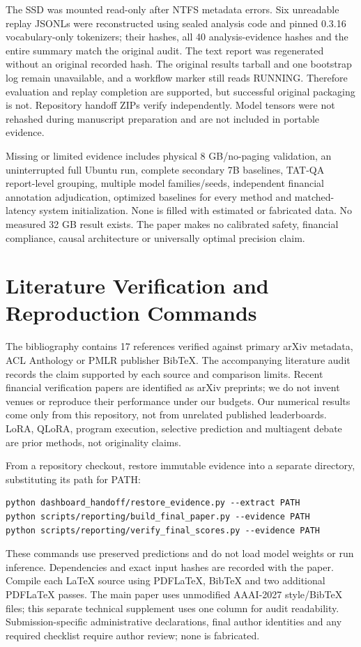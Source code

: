 \documentclass[letterpaper]{article}
\begin{document}
The SSD was mounted read-only after NTFS metadata errors. Six unreadable replay JSONLs were reconstructed using sealed analysis code and pinned 0.3.16 vocabulary-only tokenizers; their hashes, all 40 analysis-evidence hashes and the entire summary match the original audit. The text report was regenerated without an original recorded hash. The original results tarball and one bootstrap log remain unavailable, and a workflow marker still reads RUNNING. Therefore evaluation and replay completion are supported, but successful original packaging is not. Repository handoff ZIPs verify independently. Model tensors were not rehashed during manuscript preparation and are not included in portable evidence.

Missing or limited evidence includes physical 8 GB/no-paging validation, an uninterrupted full Ubuntu run, complete secondary 7B baselines, TAT-QA report-level grouping, multiple model families/seeds, independent financial annotation adjudication, optimized baselines for every method and matched-latency system initialization. None is filled with estimated or fabricated data. No measured 32 GB result exists. The paper makes no calibrated safety, financial compliance, causal architecture or universally optimal precision claim.

\section{Literature Verification and Reproduction Commands}
The bibliography contains 17 references verified against primary arXiv metadata, ACL Anthology or PMLR publisher BibTeX. The accompanying literature audit records the claim supported by each source and comparison limits. Recent financial verification papers are identified as arXiv preprints; we do not invent venues or reproduce their performance under our budgets. Our numerical results come only from this repository, not from unrelated published leaderboards. LoRA, QLoRA, program execution, selective prediction and multiagent debate are prior methods, not originality claims.

From a repository checkout, restore immutable evidence into a separate directory, substituting its path for PATH:
\begin{verbatim}
python dashboard_handoff/restore_evidence.py --extract PATH
python scripts/reporting/build_final_paper.py --evidence PATH
python scripts/reporting/verify_final_scores.py --evidence PATH
\end{verbatim}
These commands use preserved predictions and do not load model weights or run inference. Dependencies and exact input hashes are recorded with the paper. Compile each LaTeX source using PDFLaTeX, BibTeX and two additional PDFLaTeX passes. The main paper uses unmodified AAAI-2027 style/BibTeX files; this separate technical supplement uses one column for audit readability. Submission-specific administrative declarations, final author identities and any required checklist require author review; none is fabricated.
\end{document}
